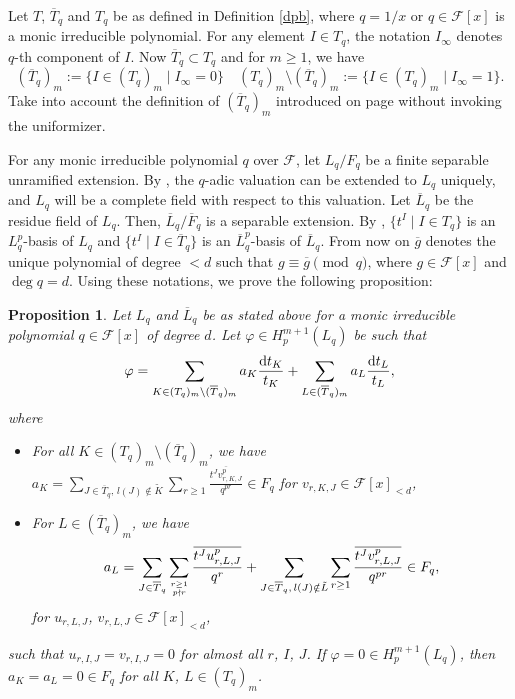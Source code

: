 \documentclass[times,10pt]{amsart}
\newcommand{\dd}{{\rm d}}
\newcommand{\F}{\ensuremath{\mathcal{F}}}
\newcommand{\n}{\ensuremath{\infty}}
\renewcommand{\phi}{\varphi}
\newtheorem{prop}[thm]{Proposition}%
\begin{document}
Let $T$, $\overline{T}_q$ and $T_q$ be  as defined in Definition \ref{dpb}, where $q=1/x$ or $q\in \F[x]$ is a monic irreducible polynomial.  For any element $I\in T_q$, the notation $I_{\infty}$ denotes $q$-th component of $I$. %
Now $\overline{T}_q\subset T_q$ and  for $m\geq 1$, we have $$ (\overline{T}_q)_m:=\{I\in (T_q)_m\mid I_{\n}=0\}\quad (T_q)_m\setminus (\overline{T}_q)_m:= \{ I\in (T_q)_m\mid I_{\n}=1\}.$$
{Take into account the definition of $(\overline{T}_q)_m$ introduced {on page} \pageref{p1} without invoking the uniformizer.}



{For any monic irreducible polynomial $q$ over $\F$, let $L_q/F_q$ be a finite separable unramified extension.} By \cite[Chapter 5]{R}, the $q$-adic valuation can be extended to $L_q$ uniquely, and  $L_q$ will be a complete field with respect to this valuation. Let $\overline{L}_q$ be the residue field of $L_q$. Then, $\overline{L}_q/ \overline{F}_q$ is a separable extension. By \cite[Lemma 3.1]{AJ},  $\{ t^I\mid I\in T_q\}$ is {an} $L_q^p$-basis of $L_q$ and $ \{ t^I\mid I\in \overline{T}_q\}$ is {an}  $\overline{L}_q^p$-basis of $\overline{L}_q$. From now on $\overline{g}$ denotes the unique polynomial of degree $<d$ such that $g\equiv \overline{g}\pmod{q}$, where $g\in \F[x]$ and $\deg q=d$. Using these notations, we prove the following proposition:

\begin{prop}\label{pru} Let  $L_q$ and  $\overline{L}_q$ be as stated above for a monic irreducible polynomial $q\in \F[x]$ of degree $d$.   Let $\phi\in H_p^{m+1}(L_q)$  be such that $$ \phi= \sum_{K\in (T_q)_m\setminus (\overline{T}_q)_m} a_K \frac{\dd t_K}{t_K}+ \sum_{L\in (\overline{T}_q)_m} a_L\frac{\dd t_L}{t_L} ,$$ where \begin{itemize}
\item For all $K\in ({T}_q)_m\setminus (\overline{T}_q)_m$, we have $a_{{K}}= \sum\limits_{J\in \overline{T}_q,\,l(J)\notin  \tilde{K}}\sum\limits_{r\geq 1}\frac{\overline{t^Jv_{r,K,J}^p}}{q^{pr}}\in F_q$ for $ v_{r,K,J}\in \F[x]_{< d}$,
\item For $L\in (\overline{T}_q)_m$, we have$$a_{{L}}=\sum\limits_{J\in \overline{T}_q} \sum\limits_{r\geq 1 \atop p\nmid r}\frac{\overline{ t^{J} u_{r,L,J}^p}} {q^{r}}+\sum\limits_{J\in \overline{T}_q,\,l(J)\notin \tilde{ L}}\sum\limits_{r\geq 1}\frac{\overline{t^Jv_{r,L,J}^p}}{q^{pr}}\in F_q,$$for $u_{r,L,J}$, $v_{r,L,J}\in \F[x]_{< d}$,  
\end{itemize}
such that $u_{r,I,J}=v_{r,I,J}=0$ for {almost} all $r$, $I$, $J$. If $\phi=0\in H_p^{m+1}(L_q)$, then $a_K=a_L=0\in F_q$ for all $K$, $L\in (T_q)_m$.
    \end{prop}
\end{document}
